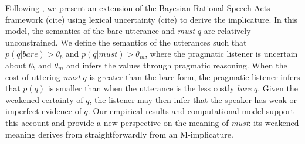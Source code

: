 \documentclass[11pt]{article}
\begin{document}
Following \cite{bergen, lassiter}, we present an extension of the Bayesian Rational Speech Acts framework (cite) using lexical uncertainty (cite) to derive the implicature. In this model,  the semantics of the bare utterance and \textit{must} $q$ are relatively unconstrained. We define the semantics of the utterances such that $p(q | \textit{bare} ) > \theta_b$ and $p(q | \textit{must} ) > \theta_m$, where the pragmatic listener is uncertain about $\theta_b$ and $\theta_m$ and infers the values through pragmatic reasoning. When the cost of uttering \textit{must} $q$ is greater than the bare form, the pragmatic listener infers that $p(q)$ is smaller than when the utterance is the less costly \textit{bare} $q$.%
Given the weakened certainty of $q$, the listener may then infer that the speaker has weak or imperfect evidence of $q$. Our empirical results and computational model  support this account and provide a new perspective on the meaning of \textit{must}: its weakened meaning derives from straightforwardly from an M-implicature.
%
\end{document}
